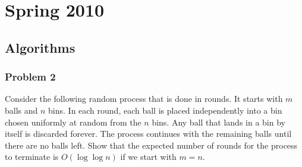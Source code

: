 \documentclass{article}
\begin{document}
\section{Spring 2010}

\subsection{Algorithms}

\subsubsection{Problem 2}

Consider the following random process that is done in rounds. It starts with $m$ balls and $n$ bins. In each round, each ball is placed independently into a bin chosen uniformly at random from the $n$ bins. Any ball that lands in a bin by itself is discarded forever. The process continues with the remaining balls until there are no balls left. Show that the expected number of rounds for the process to terminate is $O(\log \log n)$ if we start with $m = n$.
\end{document}
